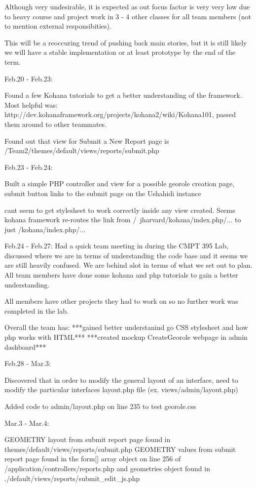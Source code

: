 \documentclass{article}
\begin{document}
	Although very undesirable, it is expected as out focus factor is very very low due to heavy course and project
	work in 3 - 4 other classes for all team members (not to mention external responsibities).
	     
	This will be a reoccuring trend of pushing back main stories, but it is still likely we will have a stable
	implementation or at least prototype by the end of the term.
	
Feb.20 - Feb.23:

	Found a few Kohana tutorials to get a better understanding of the framework.  Most helpful was:
	http://dev.kohanaframework.org/projects/kohana2/wiki/Kohana101, passed them around to other teammates.

	Found out that view for Submit a New Report page is /Team2/themes/default/views/reports/submit.php
	
Feb.23 - Feb.24:

	Built a simple PHP controller and view for a possible georole creation page, submit button links to the submit
	page on the Ushahidi instance 
	
	cant seem to get stylesheet to work correctly inside any view created.
	Seems kohana framework re-routes the link from /~jharvard/kohana/index.php/... to just /kohana/index.php/...
	
Feb.24 - Feb.27:
	Had a quick team meeting in during the CMPT 395 Lab, discussed where we are in terms of understanding the code base
	and it seems we are still heavily confused.  We are behind alot in terms of what we set out to plan.  All team members
	have done some kohana and php tutorials to gain a better understanding.
	
	All members have other projects they had to work on so no further work was completed in the lab.

        Overall the team has: 
	    ***gained better understanind go CSS stylesheet and how php works with HTML***
	    ***created mockup CreateGeorole webpage in admin dashboard***
	
Feb.28 - Mar.3:

	Discovered that in order to modify the general layout of an interface, need to modify the particular interfaces
	layout.php file (ex. views/admin/layout.php)
	
	Added code to admin/layout.php on line 235 to test georole.css
	
Mar.3 - Mar.4:

	GEOMETRY layout from submit report page found in themes/default/views/reports/submit.php
	GEOMETRY values from submit report page found in the form[] array object on line 256 of 
	/application/controllers/reports.php and geometries object found in ./default/views/reports/submit_edit_js.php
\end{document}
